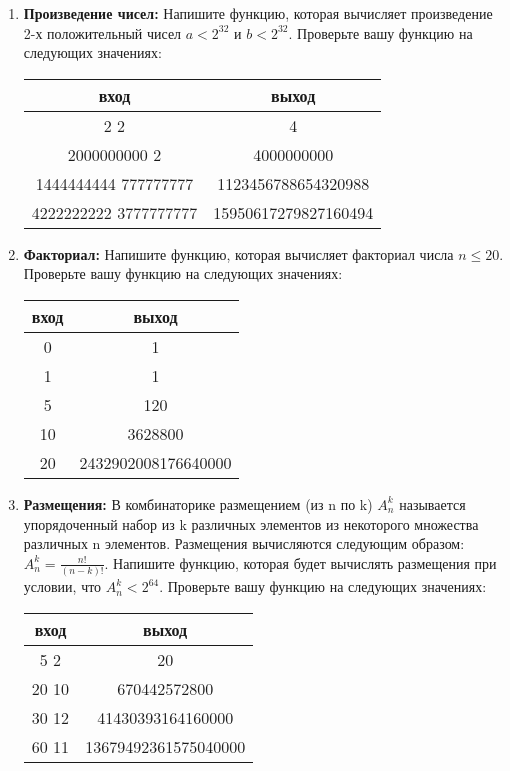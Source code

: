 \documentclass{article}
\begin{document}
\begin{enumerate}
\begin{enumerate}
\item \textbf{Произведение чисел:} Напишите функцию, которая вычисляет произведение 2-х положительный чисел $a < 2^{32}$ и $b < 2^{32}$. Проверьте вашу функцию на следующих значениях:
\begin{center}
\begin{tabular}{ c c }
 вход & выход \\ \hline
 2 2 & 4  \\ 
 2000000000 2 & 4000000000  \\ 
 1444444444 777777777 & 1123456788654320988 \\ 
 4222222222 3777777777 & 15950617279827160494 \\   
\end{tabular}
\end{center}
\item \textbf{Факториал:} Напишите функцию, которая вычисляет факториал числа $n \leq 20$. Проверьте вашу функцию на следующих значениях:
\begin{center}
\begin{tabular}{ c c }
 вход & выход \\ \hline
 0 & 1  \\ 
 1 & 1 \\  
 5 & 120   \\  
 10 & 3628800   \\  
 20 & 2432902008176640000   \\  
\end{tabular}
\end{center}

\item \textbf{Размещения:} В комбинаторике размещением (из n по k) $A_n^k$ называется упорядоченный набор из k различных элементов из некоторого множества различных n элементов. Размещения вычисляются следующим образом: $A_n^k = \frac{n!}{(n-k)!}$. Напишите функцию, которая будет вычислять размещения при условии, что  $A_n^k < 2^{64}$. Проверьте вашу функцию на следующих значениях:
\begin{center}
\begin{tabular}{ c c }
 вход & выход \\ \hline
 5 2 & 20  \\ 
 20 10 & 670442572800  \\ 
 30 12 & 41430393164160000 \\ 
 60 11 & 13679492361575040000 \\   
\end{tabular}
\end{center}




\end{enumerate}
\end{enumerate}
\end{document}
